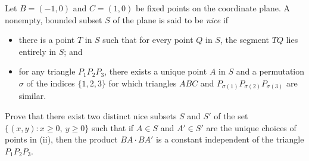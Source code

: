 Let $B = (-1, 0)$ and $C = (1, 0)$ be fixed points on the coordinate plane. A nonempty, bounded subset $S$ of the plane is said to be \emph{nice} if
\begin{itemize}
\item[(i)] there is a point $T$ in $S$ such that for every point $Q$ in $S$, the segment $TQ$ lies entirely in $S$; and
\item[(ii)] for any triangle $P_1 P_2 P_3$, there exists a unique point $A$ in $S$ and a permutation $\sigma$ of the indices $\{1, 2, 3\}$ for which triangles $ABC$ and $P_{\sigma(1)} P_{\sigma(2)} P_{\sigma(3)}$ are similar.
\end{itemize}
Prove that there exist two distinct nice subsets $S$ and $S'$ of the set $\{(x, y) : x \geq 0,\ y \geq 0\}$ such that if $A \in S$ and $A' \in S'$ are the unique choices of points in (ii), then the product $BA \cdot BA'$ is a constant independent of the triangle $P_1 P_2 P_3$.
